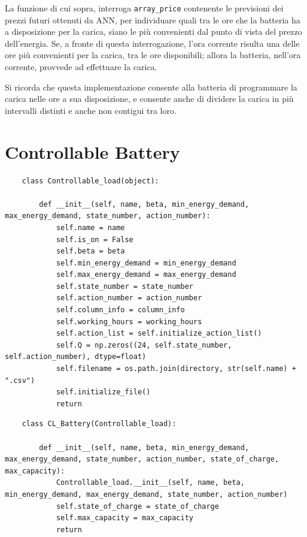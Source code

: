 \documentclass[italian, Lau, oneside]{sapthesis}
\begin{document}
La funzione di cui sopra, interroga \texttt{array\_price} contenente le previsioni dei prezzi futuri ottenuti da ANN, per individuare quali tra le ore che la batteria ha a disposizione per la carica, siano le più convenienti dal punto di vista del prezzo dell'energia. Se, a fronte di questa interrogazione, l'ora corrente risulta una delle ore più convenienti per la carica, tra le ore disponibili; allora la batteria, nell'ora corrente, provvede ad effettuare la carica.

Si ricorda che questa implementazione consente alla batteria di programmare la carica nelle ore a sua disposizione, e consente anche di dividere la carica in più intervalli distinti e anche non contigui tra loro.





\section{Controllable Battery}
\begin{verbatim}
    class Controllable_load(object):
    
        def __init__(self, name, beta, min_energy_demand, max_energy_demand, state_number, action_number):
            self.name = name
            self.is_on = False
            self.beta = beta
            self.min_energy_demand = min_energy_demand
            self.max_energy_demand = max_energy_demand 
            self.state_number = state_number
            self.action_number = action_number
            self.column_info = column_info
            self.working_hours = working_hours
            self.action_list = self.initialize_action_list()
            self.Q = np.zeros((24, self.state_number, self.action_number), dtype=float)
            self.filename = os.path.join(directory, str(self.name) + ".csv")
            self.initialize_file()
            return
\end{verbatim}

\begin{verbatim}
    class CL_Battery(Controllable_load):
    
        def __init__(self, name, beta, min_energy_demand, max_energy_demand, state_number, action_number, state_of_charge, max_capacity):
            Controllable_load.__init__(self, name, beta, min_energy_demand, max_energy_demand, state_number, action_number)
            self.state_of_charge = state_of_charge
            self.max_capacity = max_capacity
            return
\end{verbatim}
\end{document}
